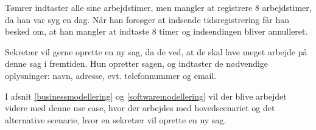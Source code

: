 Tømrer indtaster alle sine arbejdstimer, men mangler at registrere 8 arbejdstimer, da han var syg en dag.
Når han forsøger at indsende tidsregistrering får han besked om, at han mangler at indtaste 8 timer og indsendingen bliver annulleret.

Sekretær vil gerne oprette en ny sag, da de ved, at de skal lave meget arbejde på denne sag i fremtiden.
Hun opretter sagen, og indtaster de nødvendige oplysninger: navn, adresse, evt. telefonnummer og email.

I afsnit \ref{businessmodellering} og \ref{softwaremodellering} vil der blive arbejdet videre med denne use case, hvor der arbejdes med hovedscenariet og det alternative scenarie, hvor en sekretær vil oprette en ny sag.


